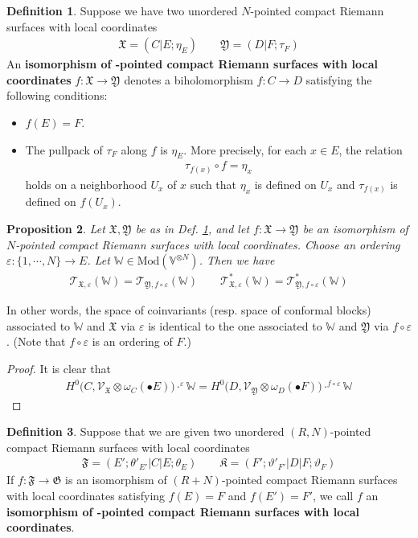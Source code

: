 \documentclass[11pt,b5paper,notitlepage]{article}
\theoremstyle{definition}
\newtheorem{df}{Definition}[section]
\theoremstyle{plain}
\newtheorem{pp}[df]{Proposition}
\newcommand{\fk}{\mathfrak}
\newcommand{\SV}{\mathscr{V}}
\newcommand{\blt}{\bullet}
\newcommand{\Vbb}{\mathbb V}
\newcommand{\Wbb}{\mathbb W}
\newcommand{\<}{\left\langle}
\renewcommand{\>}{\right\rangle}
\newcommand{\fx}{\mathfrak{X}}
\newcommand{\ST}{\mathscr{T}}
\newcommand{\Mod}{\mathrm{Mod}}
\newcommand{\eps}{\varepsilon}
\newcommand{\fy}{\mathfrak{Y}}
\newcommand{\ff}{\mathfrak{F}}
\newcommand{\fg}{\mathfrak{G}}
\numberwithin{equation}{section}
\begin{document}
\begin{df}\label{lb5}
	Suppose we have two unordered $N$-pointed compact Riemann surfaces with local coordinates 
\begin{gather*}
\fx=(C\big|E;\eta_E)\qquad \fy=(D\big|F;\tau_F)
\end{gather*}
An \textbf{isomorphism of -pointed compact Riemann surfaces with local coordinates} $f:\fx\rightarrow\fy$ denotes a biholomorphism $f:C\rightarrow D$ satisfying the following conditions:
	\begin{itemize}
		\item $f(E)=F$.
		\item The pullpack of $\tau_F$ along $f$ is $\eta_E$. More precisely, for each $x\in E$, the relation
\begin{align*}
\tau_{f(x)}\circ f=\eta_x
\end{align*}
holds on a neighborhood $U_x$ of $x$ such that $\eta_x$ is defined on $U_x$ and $\tau_{f(x)}$ is defined on $f(U_x)$.
	\end{itemize}
\end{df}

\begin{pp}\label{lb7}
Let $\fx,\fy$ be as in Def. \ref{lb5}, and let $f:\fx\rightarrow\fy$ be an isomorphism of $N$-pointed compact Riemann surfaces with local coordinates. Choose an ordering $\eps:\{1,\cdots, N\}\rightarrow E$. Let $\Wbb\in \Mod(\Vbb^{\otimes N})$. Then we have
\begin{align*}
\ST_{\fx,\eps}(\Wbb)=\ST_{\fy,f\circ \eps}(\Wbb)\qquad \ST_{\fx,\eps}^*(\Wbb)=\ST_{\fy,f\circ \eps}^*(\Wbb)
\end{align*}
\end{pp}

In other words, the space of coinvariants (resp. space of conformal blocks) associated to $\Wbb$ and $\fx$ via $\eps$ is identical to the one associated to $\Wbb$ and $\fy$ via $f\circ\eps$. (Note that $f\circ\eps$ is an ordering of $F$.)

\begin{proof}
It is clear that
		\begin{gather*}
			H^0\big(C,\SV_{\fx}\otimes \omega_C(\blt E)\big)\cdot^\eps \Wbb=H^0\big(D,\SV_{\fy}\otimes \omega_D(\blt F)\big)\cdot^{f\circ \eps} \Wbb
		\end{gather*}
\end{proof}


\begin{df}\label{lb6}
	Suppose that we are given two unordered $(R,N)$-pointed compact Riemann surfaces with local coordinates
	\begin{gather*}
		\ff=(E';\theta'_{E'}\big|C\big|E;\theta_E)\qquad
		\fk K=(F';\vartheta'_{F'}\big|D\big|F;\vartheta_F)
	\end{gather*}
If $f:\ff\rightarrow\fg$ is an isomorphism of $(R+N)$-pointed compact Riemann surfaces with local coordinates satisfying $f(E)=F$ and $f(E')=F'$, we call $f$ an \textbf{isomorphism of -pointed compact Riemann surfaces with local coordinates}.
\end{df}
\end{document}
